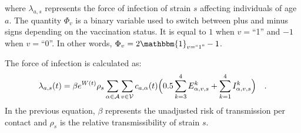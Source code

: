 where $\lambda_{a,s}$ represents the force of infection of strain $s$ affecting individuals of age $a$. The quantity $\Phi_v$ is a binary variable
used to switch between plus and minus signs depending on the vaccination status. It is equal to $1$ when
$v=$``1'' and $-1$ when $v=$``0''. In other words, $\Phi_v = 2\mathbbm{1}_{v=``1"} - 1$. 

The force of infection is calculated as:
\begin{equation}
    \label{foi}
 \lambda_{a,s}(t) = \beta e^{W(t)} \rho_{s} \sum_{\alpha \in \mathcal{A}} \sum_{v \in \mathcal{V}} c_{a,\alpha}(t) \Bigl( 0.5 \sum_{k=3}^{4} E_{\alpha,v,s}^{k} + \sum_{k=1}^{4} I_{\alpha,v,s}^{k} \Bigr) \quad .
\end{equation}
In the previous equation, $\beta$ represents the unadjusted risk of transmission per contact and $\rho_{s}$ is the relative transmissibility of strain $s$.